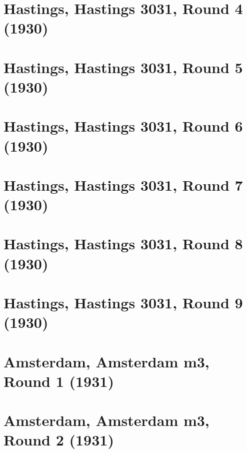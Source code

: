 \documentclass[11pt]{article}
\begin{document}
\section{Hastings, Hastings 3031, Round 4 (1930)}


\clearpage

\section{Hastings, Hastings 3031, Round 5 (1930)}


\clearpage

\section{Hastings, Hastings 3031, Round 6 (1930)}


\clearpage

\section{Hastings, Hastings 3031, Round 7 (1930)}


\clearpage

\section{Hastings, Hastings 3031, Round 8 (1930)}


\clearpage

\section{Hastings, Hastings 3031, Round 9 (1930)}


\clearpage

\section{Amsterdam, Amsterdam m3, Round 1 (1931)}


\clearpage

\section{Amsterdam, Amsterdam m3, Round 2 (1931)}


\clearpage
\end{document}
